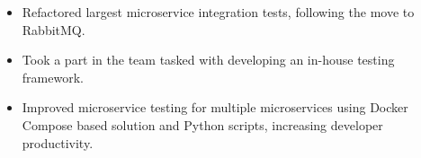 \begin{itemize}
    \item Refactored largest microservice integration 
        tests, following the move to RabbitMQ. 
    \item Took a part in the team tasked with developing an in-house testing framework.
    \item Improved microservice testing for multiple microservices using Docker Compose based solution and Python scripts,
        increasing developer productivity.  
\end{itemize}
